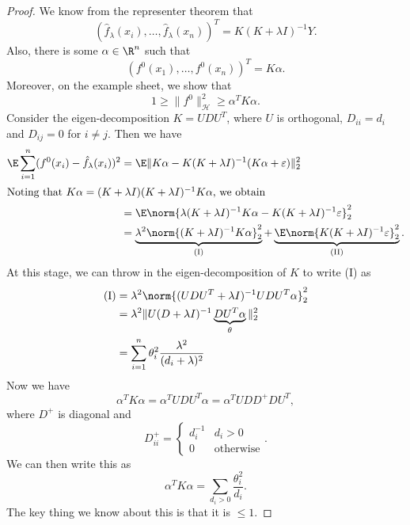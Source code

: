 \documentclass[a4paper]{article}
\begin{document}
\begin{proof}
  We know from the representer theorem that
  \[
    (\hat{f}_\lambda (x_i), \ldots, \hat{f}_\lambda (x_n))^T = K(K + \lambda I)^{-1} Y.
  \]
  Also, there is some $\alpha \in \R^n$ such that
  \[
    (f^0(x_1), \ldots, f^0(x_n))^T = K \alpha.
  \]
  Moreover, on the example sheet, we show that
  \[
    1 \geq \|f^0\|_{\mathcal{H}}^2 \geq \alpha^T K \alpha.
  \]
  Consider the eigen-decomposition $K = UDU^T$, where $U$ is orthogonal, $D_{ii} = d_i$ and $D_{ij} = 0$ for $i \not= j$. Then we have
  \begin{align*}
    \E \sum_{i = 1}^n (f^0(x_i) - \hat{f}_\lambda (x_i))^2 &= \E\|K\alpha - K(K + \lambda I)^{-1} (K\alpha + \varepsilon)\|_2^2\\
    \intertext{Noting that $K\alpha= (K + \lambda I)(K + \lambda I)^{-1} K\alpha$, we obtain}
    &= \E \norm{\lambda (K + \lambda I)^{-1} K\alpha - K(K + \lambda I)^{-1} \varepsilon}_2^2\\
    &= \underbrace{\lambda^2 \norm{(K + \lambda I)^{-1} K\alpha}_2^2}_{\mathrm{(I)}} + \underbrace{\E \norm{K(K + \lambda I)^{-1} \varepsilon}_2^2}_{\mathrm{(II)}}.
  \end{align*}
  At this stage, we can throw in the eigen-decomposition of $K$ to write (I) as
  \begin{align*}
    \mathrm{(I)} &= \lambda^2 \norm{(UDU^T + \lambda I)^{-1} UDU^T \alpha }_2^2\\
    &= \lambda^2 \|U (D + \lambda I)^{-1} \underbrace{D U^T \alpha}_{\theta} \|_2^2\\
    &= \sum_{i = 1}^n \theta_i^2 \frac{\lambda^2}{(d_i + \lambda)^2}
  \end{align*}
  Now we have
  \[
    \alpha^T K \alpha = \alpha^T U DU^T \alpha = \alpha^T U DD^+ DU^T,
  \]
  where $D^+$ is diagonal and
  \[
    D_{ii}^+ =
    \begin{cases}
      d_i^{-1} & d_i > 0\\
      0 & \text{otherwise}
    \end{cases}.
  \]
  We can then write this as
  \[
    \alpha^T K \alpha = \sum_{d_i > 0} \frac{\theta_i^2}{d_i}.
  \]
  The key thing we know about this is that it is $\leq 1$.


\end{proof}
\end{document}
